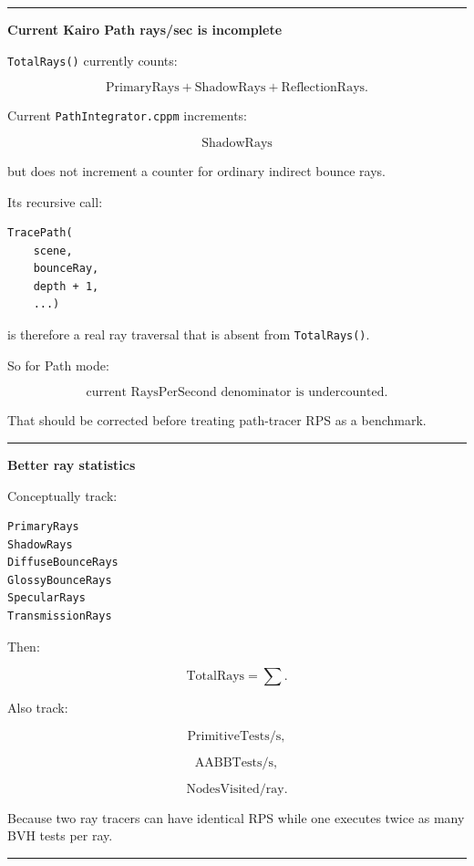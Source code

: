 \begin{center}\rule{0.5\linewidth}{0.5pt}\end{center}

\textbf{Current Kairo Path rays/sec is incomplete}

\texttt{TotalRays()} currently counts:

\[
\text{PrimaryRays}
+
\text{ShadowRays}
+
\text{ReflectionRays}.
\]

Current \texttt{PathIntegrator.cppm} increments:

\[
\text{ShadowRays}
\]

but does not increment a counter for ordinary indirect bounce rays.

Its recursive call:

\begin{verbatim}
TracePath(
    scene,
    bounceRay,
    depth + 1,
    ...)
\end{verbatim}

is therefore a real ray traversal that is absent from \texttt{TotalRays()}.

So for Path mode:

\[
\boxed{
\text{current RaysPerSecond denominator is undercounted}.
}
\]

That should be corrected before treating path-tracer RPS as a benchmark.

\begin{center}\rule{0.5\linewidth}{0.5pt}\end{center}

\textbf{Better ray statistics}

Conceptually track:

\begin{verbatim}
PrimaryRays
ShadowRays
DiffuseBounceRays
GlossyBounceRays
SpecularRays
TransmissionRays
\end{verbatim}

Then:

\[
\text{TotalRays}
=
\sum.
\]

Also track:

\[
\text{PrimitiveTests/s},
\]

\[
\text{AABBTests/s},
\]

\[
\text{NodesVisited/ray}.
\]

Because two ray tracers can have identical RPS while one executes twice as many BVH tests per ray.

\begin{center}\rule{0.5\linewidth}{0.5pt}\end{center}

